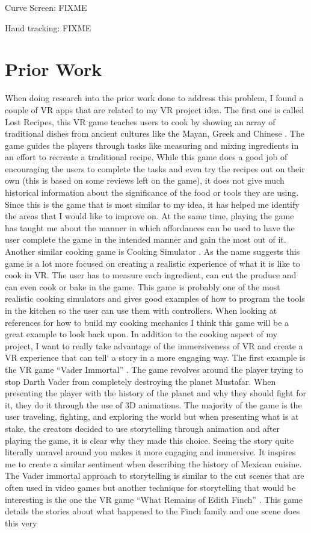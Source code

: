 \documentclass[11pt,twocolumn]{article}
\begin{document}
Curve Screen: FIXME
 
Hand tracking: FIXME



\section{Prior Work}
When doing research into the prior work done to address this problem, I found a couple of VR apps that are related to my VR project idea. The first one is called Lost Recipes, this VR game teaches users to cook by showing an array of traditional dishes from ancient cultures like the Mayan, Greek and Chinese \cite{lostrecipes2022}. The game guides the players through tasks like measuring and mixing ingredients in an effort to recreate a traditional recipe. While this game does a good job of encouraging the users to complete the tasks and even try the recipes out on their own (this is based on some reviews left on the game), it does not give much historical information about the significance of the food or tools they are using. Since this is the game that is most similar to my idea, it has helped me identify the areas that I would like to improve on. At the same time, playing the game has taught me about the manner in which affordances can be used to have the user complete the game in the intended manner and gain the most out of it. Another similar cooking game is Cooking Simulator \cite{cookingsim2019}. As the name suggests this game is a lot more focused on creating a realistic experience of what it is like to cook in VR. The user has to measure each ingredient, can cut the produce and can even cook or bake in the game. This game is probably one of the most realistic cooking simulators and gives good examples of how to program the tools in the kitchen so the user can use them with controllers. When looking at references for how to build my cooking mechanics I think this game will be a great example to look back upon. In addition to the cooking aspect of my project, I want to really take advantage of the immersiveness of VR and create a VR experience that can tell` a story in a more engaging way. The first example is the VR game “Vader Immortal” \cite{vadarimmortal2019ep1}. The game revolves around the player trying to stop Darth Vader from completely destroying the planet Mustafar. When presenting the player with the history of the planet and why they should fight for it, they do it through the use of 3D animations. The majority of the game is the user traveling, fighting, and exploring the world but when presenting what is at stake, the creators decided to use storytelling through animation and after playing the game, it is clear why they made this choice. Seeing the story quite literally unravel around you makes it more engaging and immersive. It inspires me to create a similar sentiment when describing the history of Mexican cuisine. The Vader immortal approach to storytelling is similar to the cut scenes that are often used in video games but another technique for storytelling that would be interesting is the one the VR game “What Remains of Edith Finch” \cite{finch2019}. This game details the stories about what happened to the Finch family and one scene does this very 
\end{document}

